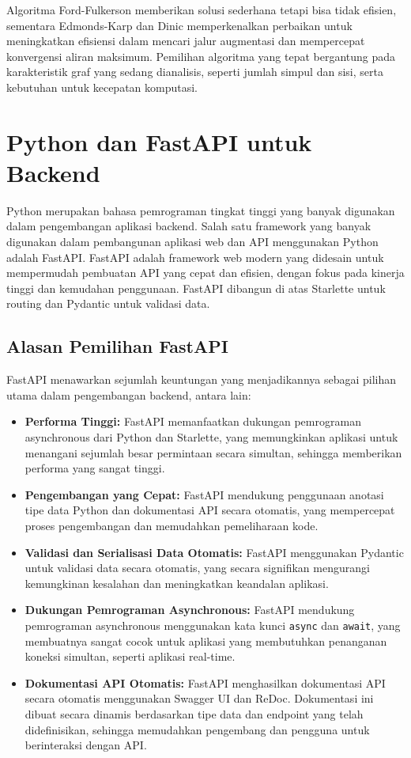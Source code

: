 Algoritma Ford-Fulkerson memberikan solusi sederhana tetapi bisa tidak efisien, sementara Edmonds-Karp dan Dinic memperkenalkan perbaikan untuk meningkatkan efisiensi dalam mencari jalur augmentasi dan mempercepat konvergensi aliran maksimum. Pemilihan algoritma yang tepat bergantung pada karakteristik graf yang sedang dianalisis, seperti jumlah simpul dan sisi, serta kebutuhan untuk kecepatan komputasi.


\section{Python dan FastAPI untuk Backend}
\label{sec:python_fastapi}

Python merupakan bahasa pemrograman tingkat tinggi yang banyak digunakan dalam pengembangan aplikasi backend. Salah satu framework yang banyak digunakan dalam pembangunan aplikasi web dan API menggunakan Python adalah FastAPI. FastAPI adalah framework web modern yang didesain untuk mempermudah pembuatan API yang cepat dan efisien, dengan fokus pada kinerja tinggi dan kemudahan penggunaan. FastAPI dibangun di atas Starlette untuk routing dan Pydantic untuk validasi data.

\subsection{Alasan Pemilihan FastAPI}
FastAPI menawarkan sejumlah keuntungan yang menjadikannya sebagai pilihan utama dalam pengembangan backend, antara lain:

\begin{itemize}
    \item \textbf{Performa Tinggi:} FastAPI memanfaatkan dukungan pemrograman asynchronous dari Python dan Starlette, yang memungkinkan aplikasi untuk menangani sejumlah besar permintaan secara simultan, sehingga memberikan performa yang sangat tinggi.
    \item \textbf{Pengembangan yang Cepat:} FastAPI mendukung penggunaan anotasi tipe data Python dan dokumentasi API secara otomatis, yang mempercepat proses pengembangan dan memudahkan pemeliharaan kode.
    \item \textbf{Validasi dan Serialisasi Data Otomatis:} FastAPI menggunakan Pydantic untuk validasi data secara otomatis, yang secara signifikan mengurangi kemungkinan kesalahan dan meningkatkan keandalan aplikasi.
    \item \textbf{Dukungan Pemrograman Asynchronous:} FastAPI mendukung pemrograman asynchronous menggunakan kata kunci \texttt{async} dan \texttt{await}, yang membuatnya sangat cocok untuk aplikasi yang membutuhkan penanganan koneksi simultan, seperti aplikasi real-time.
    \item \textbf{Dokumentasi API Otomatis:} FastAPI menghasilkan dokumentasi API secara otomatis menggunakan Swagger UI dan ReDoc. Dokumentasi ini dibuat secara dinamis berdasarkan tipe data dan endpoint yang telah didefinisikan, sehingga memudahkan pengembang dan pengguna untuk berinteraksi dengan API.
\end{itemize}

